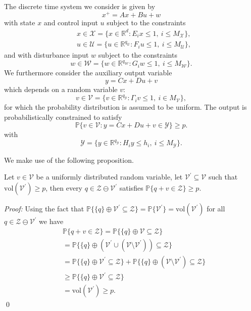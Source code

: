 \documentclass{ifacconf}
\def\bpf{\textnormal{\textit{Proof:}\hspace{1ex}}}
\def\epf{\hfill \mbox{\qed}}%
\providecommand{\vol}{\text{vol}}
\providecommand{\W}{\mathcal W}
\providecommand{\V}{\mathcal V}
\providecommand{\X}{\mathcal X}
\providecommand{\Y}{\mathcal Y}
\providecommand{\Z}{\mathcal Z}
\providecommand{\U}{\mathcal U}
\providecommand{\PP}{\mathbb P}
\providecommand{\RR}{\mathbb R}
\begin{document}
The discrete time system we consider is given by
%
\begin{equation}
	x^+ = Ax + Bu + w
\end{equation}
%
with state $x$ and control input $u$ subject to the constraints 
\begin{align*}
&x \in\X = \bigl\{x\in\RR^d : E_ix\leq 1, \ i\leq M_\X\bigr\}, \\
&u\in\U = \bigl\{u\in\RR^{q_\U} : F_i u\leq 1, \ i\leq M_\U\bigr\},
\end{align*} 
and with disturbance input $w$ subject to the constraints
\[
w\in\W = \bigl\{w\in\RR^{q_\W}:G_i w\leq 1,\ i\leq M_\W \bigr\}.
\]
%
We furthermore consider the auxiliary output variable 
%
\begin{equation}
	y = Cx + Du + v
\end{equation}
%
which depends on a random variable $v$:
\[
v\in\V = \bigl\{v\in\RR^{q_\Y}:\Gamma_i v\leq 1, \ i\in M_\V\bigr\},
\]
for which the probability distribution is assumed to be uniform.
%
The output is probabilistically constrained to satisfy
%
\begin{equation}\label{eq:probabilistic:constraint}
	\PP\bigl\{ v \in \mathcal{V} : y = Cx + Du + v \in \mathcal{Y} \bigr\}\geq p.
\end{equation}
%
with
\[
\Y=\bigl\{y\in\RR^{q_\Y} : H_i y\leq h_i, \ i\leq M_\Y\bigr\}.
\]

We make  use of the following proposition.
%

\vspace{0.5\baselineskip}\begin{prop}
Let $v\in\V$ be a uniformly distributed random variable, let $\V^\prime\subseteq\V$ such that $\vol(\V^\prime)\geq p$, then every $q\in\Z\ominus\V^\prime$ satisfies $\PP\{q+v\in\Z\}\geq p$.
\end{prop}
%
\bpf
%
Using the fact that $\PP\{\{q\}\oplus\V^\prime\subseteq\Z\} = \PP\{\V^\prime\} = \vol(\V^\prime)$ for all $q\in\Z\ominus\V^\prime$ we have
%
\begin{equation}\begin{split}
&\PP\{q+v\in\Z\} = \PP\{\{q\}\oplus\V\subseteq\Z\} 
 \\
&=\PP\{\{q\}\oplus(\V^\prime\cup(\V\setminus\V^\prime))\subseteq\Z\} \\
&=\PP\{\{q\}\oplus\V^\prime\subseteq\Z\} + \PP\{\{q\}\oplus(\V\setminus\V^\prime)\subseteq\Z\} \\
&\geq\PP\{\{q\}\oplus\V^\prime\subseteq\Z\}\\ &=\vol(\V^\prime)\geq p.
\end{split}\end{equation}
\mbox{}\vspace{-0.5\baselineskip}
\epf
%
\end{document}
